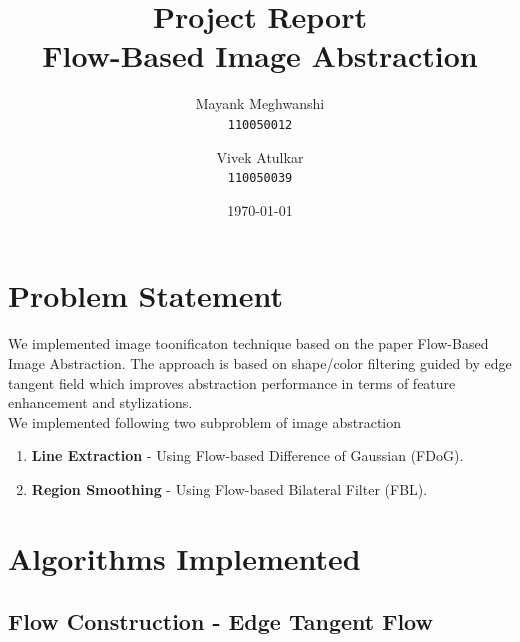 \documentclass[a4paper]{article}
\title{Project Report\\ Flow-Based Image Abstraction}
\author{
	Mayank Meghwanshi\\ \texttt{110050012} 
    \and 
    Vivek Atulkar\\ \texttt{110050039}
    }
\date{\today}
\begin{document}
\maketitle


\section{Problem Statement}

We implemented image toonificaton technique based on the paper Flow-Based Image Abstraction\cite{10.1109/TVCG.2008.81}. The approach is based on shape/color filtering guided by edge tangent field which improves abstraction performance in terms of feature enhancement and stylizations. 
\\
We implemented following two subproblem of image abstraction
\begin{enumerate}
\item \textbf{Line Extraction} - Using Flow-based Difference of Gaussian (FDoG).
\item \textbf{Region Smoothing} - Using Flow-based Bilateral Filter (FBL).
\end{enumerate}

\section{Algorithms Implemented}

\subsection{Flow Construction - Edge Tangent Flow}
\end{document}
